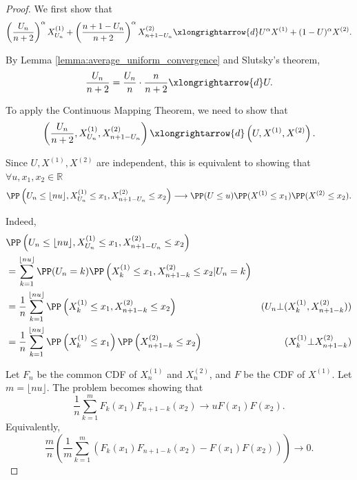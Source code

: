 \begin{proof}
  We first show that
  $$\left(\dfrac{U_n}{n+2}\right)^\alpha X_{U_n}^{(1)} + \left(\dfrac{n+1-U_n}{n+2}\right)^\alpha X_{n+1-U_n}^{(2)} \xlongrightarrow{d} U^\alpha X^{(1)} + (1-U)^\alpha X^{(2)}.$$

  By Lemma \ref{lemma:average_uniform_convergence} and Slutsky's theorem,
  $$\dfrac{U_n}{n+2} = \dfrac{U_n}{n} \cdot \dfrac{n}{n+2} \xlongrightarrow{d} U.$$

  To apply the Continuous Mapping Theorem, we need to show that
  $$\left(\dfrac{U_n}{n+2}, X_{U_n}^{(1)}, X_{n+1-U_n}^{(2)}\right) \xlongrightarrow{d} \left(U, X^{(1)}, X^{(2)}\right).$$

  Since $U, X^{(1)}, X^{(2)}$ are independent, this is equivalent to showing that $\forall u, x_1, x_2 \in \mathbb{R}$
  $$\PP\left(U_n \le \lfloor nu \rfloor, X_{U_n}^{(1)} \le x_1, X_{n+1-U_n}^{(2)} \le x_2\right) \longrightarrow \PP(U \le u) \PP(X^{(1)} \le x_1) \PP(X^{(2)} \le x_2).$$

  Indeed,
  \begin{align*}
     & \PP\left(U_n \le \lfloor nu \rfloor, X_{U_n}^{(1)} \le x_1, X_{n+1-U_n}^{(2)} \le x_2\right)                                                                         \\
     & = \sum_{k=1}^{\lfloor nu \rfloor} \PP(U_n=k) \PP\left(X_{k}^{(1)} \le x_1, X_{n+1-k}^{(2)} \le x_2 | U_n=k\right)                                                    \\
     & =  \dfrac{1}{n}\sum_{k=1}^{\lfloor nu \rfloor} \PP\left(X_{k}^{(1)} \le x_1, X_{n+1-k}^{(2)} \le x_2\right)               & (U_n\bot (X_{k}^{(1)}, X_{n+1-k}^{(2)})) \\
     & =  \dfrac{1}{n}\sum_{k=1}^{\lfloor nu \rfloor} \PP\left(X_{k}^{(1)} \le x_1\right)\PP\left(X_{n+1-k}^{(2)} \le x_2\right) & (X_{k}^{(1)} \bot X_{n+1-k}^{(2)})       \\
  \end{align*}

  Let $F_n$ be the common CDF of $X_n^{(1)}$ and $X_n^{(2)}$, and $F$ be the CDF of $X^{(1)}$. Let $m = \lfloor nu \rfloor$. The problem becomes showing that
  $$\dfrac{1}{n}\sum_{k=1}^{m} F_k(x_1)F_{n+1-k}(x_2) \longrightarrow u F(x_1) F(x_2).$$
  Equivalently,
  $$\dfrac{m}{n}\left(\dfrac{1}{m}\sum_{k=1}^{m} \left(F_k(x_1)F_{n+1-k}(x_2)-F(x_1) F(x_2)\right)\right) \longrightarrow 0.$$


\end{proof}
